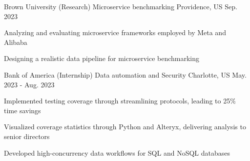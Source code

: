 \begin{cventries}
  \cventry
    {Brown University}
    {(Research) Microservice benchmarking}
    {Providence, US}
    {Sep. 2023}
    {
      \begin{cvitems}
        \item {Analyzing and evaluating microservice frameworks employed by Meta and Alibaba}
        \item {Designing a realistic data pipeline for microservice benchmarking}
      \end{cvitems}
    }

  \cventry
    {Bank of America}
    {(Internship) Data automation and Security}
    {Charlotte, US}
    {May. 2023 - Aug. 2023}
    {
      \begin{cvitems}
        \item {Implemented testing coverage through streamlining protocols, leading to 25\% time savings}
        \item {Visualized coverage statistics through Python and Alteryx, delivering analysis to senior directors}
        \item {Developed high-concurrency data workflows for SQL and NoSQL databases}
      \end{cvitems}
    }

  \begin{comment}
  \cventry
    {Machine Learning \& Computation}
    {Chemical Molecular Energy Optimization}
    {Providence, RI}
    {Aug 2022 - Present}
    {
      \begin{cvitems}
        \item {Analyzed traditional Hartree-Fock and DFT methods with Gaussian}
        \item {Implemented the original data pipeline on Brown's Oscar super computing cluster with 200x speed}
        \item {Working on an efficient Belief Propagation network based on HMC}
      \end{cvitems}
    }
  \end{comment}


\end{cventries}
